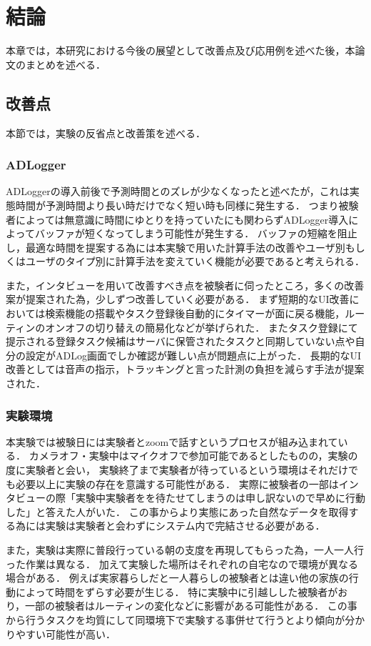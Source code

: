 \chapter{結論}
本章では，本研究における今後の展望として改善点及び応用例を述べた後，本論文のまとめを述べる．

\section{改善点}
本節では，実験の反省点と改善策を述べる．

\subsection{ADLogger}
ADLoggerの導入前後で予測時間とのズレが少なくなったと述べたが，これは実態時間が予測時間より長い時だけでなく短い時も同様に発生する．
つまり被験者によっては無意識に時間にゆとりを持っていたにも関わらずADLogger導入によってバッファが短くなってしまう可能性が発生する．
バッファの短縮を阻止し，最適な時間を提案する為には本実験で用いた計算手法の改善やユーザ別もしくはユーザのタイプ別に計算手法を変えていく機能が必要であると考えられる．

また，インタビューを用いて改善すべき点を被験者に伺ったところ，多くの改善案が提案された為，少しずつ改善していく必要がある．
まず短期的なUI改善においては検索機能の搭載やタスク登録後自動的にタイマーが面に戻る機能，ルーティンのオンオフの切り替えの簡易化などが挙げられた．
またタスク登録にて提示される登録タスク候補はサーバに保管されたタスクと同期していない点や自分の設定がADLog画面でしか確認が難しい点が問題点に上がった．
長期的なUI改善としては音声の指示，トラッキングと言った計測の負担を減らす手法が提案された．

\subsection{実験環境}
本実験では被験日には実験者とzoomで話すというプロセスが組み込まれている．
カメラオフ・実験中はマイクオフで参加可能であるとしたものの，実験の度に実験者と会い，
実験終了まで実験者が待っているという環境はそれだけでも必要以上に実験の存在を意識する可能性がある．
実際に被験者の一部はインタビューの際「実験中実験者をを待たせてしまうのは申し訳ないので早めに行動した」と答えた人がいた．
この事からより実態にあった自然なデータを取得する為には実験は実験者と会わずにシステム内で完結させる必要がある．

また，実験は実際に普段行っている朝の支度を再現してもらった為，一人一人行った作業は異なる．
加えて実験した場所はそれぞれの自宅なので環境が異なる場合がある．
例えば実家暮らしだと一人暮らしの被験者とは違い他の家族の行動によって時間をずらす必要が生じる．
特に実験中に引越しした被験者がおり，一部の被験者はルーティンの変化などに影響がある可能性がある．
この事から行うタスクを均質にして同環境下で実験する事併せて行うとより傾向が分かりやすい可能性が高い．

